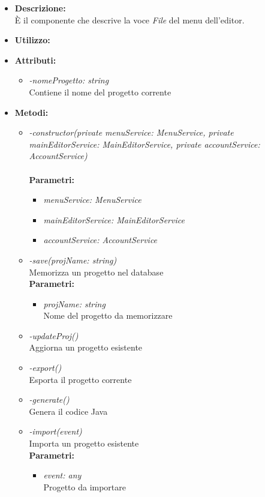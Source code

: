 \begin{itemize}
	\item \textbf{Descrizione:}\\
	È il componente che descrive la voce \textit{File} del menu dell'editor.
	\item \textbf{Utilizzo:}\\
	
	\item \textbf{Attributi:}
		\begin{itemize}
			\item \emph{-nomeProgetto: string}\\
			Contiene il nome del progetto corrente
		\end{itemize}
	\item \textbf{Metodi:}
		\begin{itemize}
			\item \emph{-constructor(private menuService: MenuService,
    private mainEditorService: MainEditorService,
    private accountService: AccountService)}\\
    		\\
    		\textbf{Parametri:}
    		\begin{itemize}
    			\item \emph{menuService: MenuService}\\
    			
    			\item \emph{mainEditorService: MainEditorService}\\
    			
    			\item \emph{accountService: AccountService}\\
    			
    		\end{itemize}
    		\item \emph{-save(projName: string)}\\
    		Memorizza un progetto nel database\\
    		\textbf{Parametri:}
    		\begin{itemize}
    			\item \emph{projName: string}\\
    			Nome del progetto da memorizzare
    		\end{itemize}
    		\item \emph{-updateProj()}\\
    		Aggiorna un progetto esistente
    		\item \emph{-export()}\\
    		Esporta il progetto corrente
    		\item \emph{-generate()}\\
    		Genera il codice Java
    		\item \emph{-import(event)}\\
    		Importa un progetto esistente\\
    		\textbf{Parametri:}
    		\begin{itemize}
    			\item \emph{event: any}\\
    			Progetto da importare
    		\end{itemize}
		\end{itemize}
\end{itemize}